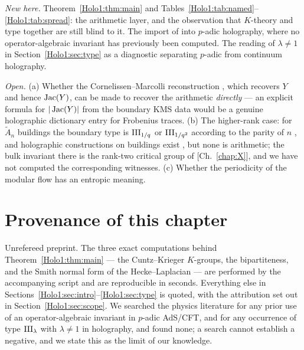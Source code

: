 \emph{New here.} Theorem~\ref{Holo1:thm:main} and Tables~\ref{Holo1:tab:named}--\ref{Holo1:tab:spread}: the
arithmetic layer, and the observation that $K$-theory and type together are still blind to
it. The import of \cite{Rob05,CM13} into $p$-adic holography, where no operator-algebraic
invariant has previously been computed. The reading of $\lambda\ne1$ in
Section~\ref{Holo1:sec:type} as a diagnostic separating $p$-adic from continuum holography.

\emph{Open.} (a) Whether the Cornelissen--Marcolli reconstruction \cite{CM13}, which
recovers $Y$ and hence $\operatorname{Jac}(Y)$, can be made to recover the arithmetic \emph{directly} ---
an explicit formula for $|\operatorname{Jac}(Y)|$ from the boundary KMS data would be a genuine
holographic dictionary entry for Frobenius traces. (b) The higher-rank case: for
$\widetilde A_n$ buildings the boundary type is $\mathrm{III}_{1/q}$ or $\mathrm{III}_{1/q^2}$ according to
the parity of $n$ \cite{CR03}, and holographic constructions on buildings exist
\cite{GMP22,Marcolli20}, but none is arithmetic; the bulk invariant there is the rank-two
critical group of [Ch.~\ref{chap:X}], and we have not computed the corresponding witnesses.
(c) Whether the periodicity of the modular flow has an entropic meaning.

\section*{Provenance of this chapter}

Unrefereed preprint. The three exact computations behind Theorem~\ref{Holo1:thm:main} --- the
Cuntz--Krieger $K$-groups, the bipartiteness, and the Smith normal form of the
Hecke--Laplacian --- are performed by the accompanying script and are reproducible in
seconds. Everything else in Sections~\ref{Holo1:sec:intro}--\ref{Holo1:sec:type} is quoted, with the
attribution set out in Section~\ref{Holo1:sec:scope}. We searched the physics literature for any
prior use of an operator-algebraic invariant in $p$-adic AdS/CFT, and for any occurrence of
type $\mathrm{III}_\lambda$ with $\lambda\ne1$ in holography, and found none; a search cannot
establish a negative, and we state this as the limit of our knowledge.
